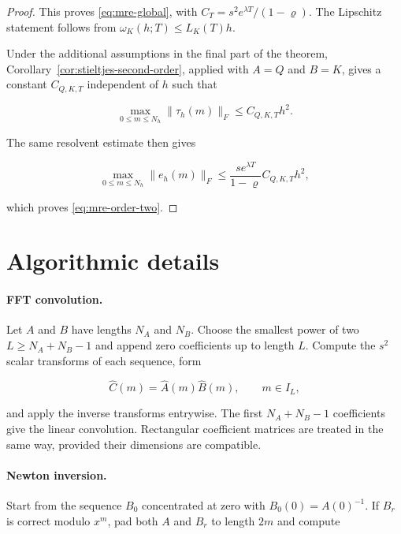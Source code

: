 \documentclass[3p,12pt,authoryear]{elsarticle}
\theoremstyle{definition}
\theoremstyle{remark}
\begin{document}
\begin{proof}
This proves \eqref{eq:mre-global}, with $C_T=s^2e^{\lambda T}/(1-\varrho)$. The Lipschitz statement follows from $\omega_K(h;T)\leq L_K(T)h$.

Under the additional assumptions in the final part of the theorem, Corollary~\ref{cor:stieltjes-second-order}, applied with $A=Q$ and $B=K$, gives a constant $C_{Q,K,T}$ independent of $h$ such that

\begin{equation*}
\max_{0\leq m\leq N_h}\|\tau_h(m)\|_F
\leq
C_{Q,K,T}h^2.
\end{equation*}

The same resolvent estimate then gives

\begin{equation*}
\max_{0\leq m\leq N_h}\|e_h(m)\|_F
\leq
\frac{s e^{\lambda T}}{1-\varrho}C_{Q,K,T}h^2,
\end{equation*}

which proves \eqref{eq:mre-order-two}.
\end{proof}

\section{Algorithmic details}\label{app:algorithms}

\paragraph{FFT convolution.}
Let $A$ and $B$ have lengths $N_A$ and $N_B$. Choose the smallest power of two $L\geq N_A+N_B-1$ and append zero coefficients up to length $L$. Compute the $s^2$ scalar transforms of each sequence, form

\begin{equation*}
\widehat C(m)=\widehat A(m)\widehat B(m),
\qquad m\in I_L,
\end{equation*}

and apply the inverse transforms entrywise. The first $N_A+N_B-1$ coefficients give the linear convolution. Rectangular coefficient matrices are treated in the same way, provided their dimensions are compatible.

\paragraph{Newton inversion.}
Start from the sequence $B_0$ concentrated at zero with $B_0(0)=A(0)^{-1}$. If $B_r$ is correct modulo $x^m$, pad both $A$ and $B_r$ to length $2m$ and compute
\end{document}

